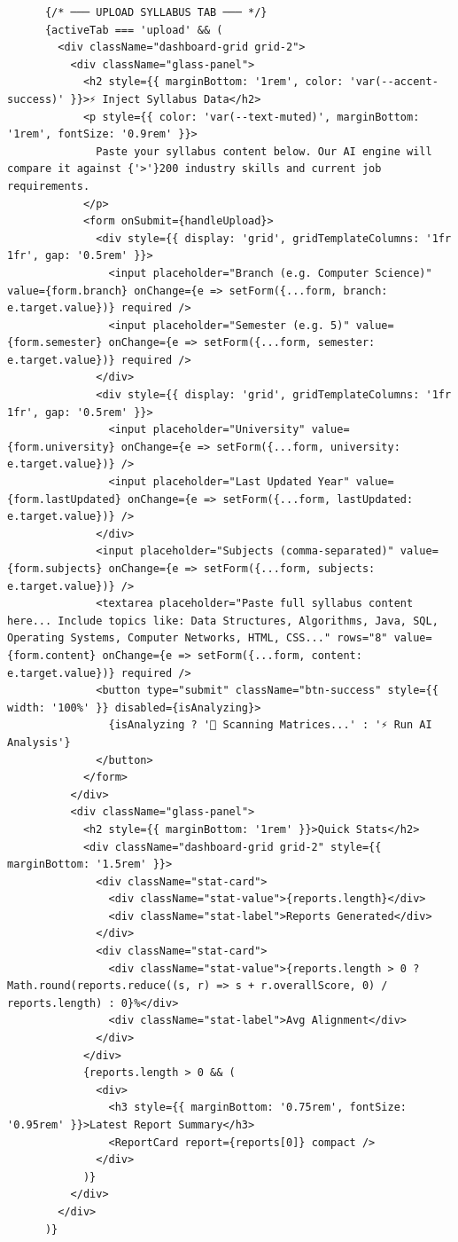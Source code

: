 \documentclass[12pt,a4paper]{report}
\begin{document}
\begin{verbatim}
      {/* ─── UPLOAD SYLLABUS TAB ─── */}
      {activeTab === 'upload' && (
        <div className="dashboard-grid grid-2">
          <div className="glass-panel">
            <h2 style={{ marginBottom: '1rem', color: 'var(--accent-success)' }}>⚡ Inject Syllabus Data</h2>
            <p style={{ color: 'var(--text-muted)', marginBottom: '1rem', fontSize: '0.9rem' }}>
              Paste your syllabus content below. Our AI engine will compare it against {'>'}200 industry skills and current job requirements.
            </p>
            <form onSubmit={handleUpload}>
              <div style={{ display: 'grid', gridTemplateColumns: '1fr 1fr', gap: '0.5rem' }}>
                <input placeholder="Branch (e.g. Computer Science)" value={form.branch} onChange={e => setForm({...form, branch: e.target.value})} required />
                <input placeholder="Semester (e.g. 5)" value={form.semester} onChange={e => setForm({...form, semester: e.target.value})} required />
              </div>
              <div style={{ display: 'grid', gridTemplateColumns: '1fr 1fr', gap: '0.5rem' }}>
                <input placeholder="University" value={form.university} onChange={e => setForm({...form, university: e.target.value})} />
                <input placeholder="Last Updated Year" value={form.lastUpdated} onChange={e => setForm({...form, lastUpdated: e.target.value})} />
              </div>
              <input placeholder="Subjects (comma-separated)" value={form.subjects} onChange={e => setForm({...form, subjects: e.target.value})} />
              <textarea placeholder="Paste full syllabus content here... Include topics like: Data Structures, Algorithms, Java, SQL, Operating Systems, Computer Networks, HTML, CSS..." rows="8" value={form.content} onChange={e => setForm({...form, content: e.target.value})} required />
              <button type="submit" className="btn-success" style={{ width: '100%' }} disabled={isAnalyzing}>
                {isAnalyzing ? '🔮 Scanning Matrices...' : '⚡ Run AI Analysis'}
              </button>
            </form>
          </div>
          <div className="glass-panel">
            <h2 style={{ marginBottom: '1rem' }}>Quick Stats</h2>
            <div className="dashboard-grid grid-2" style={{ marginBottom: '1.5rem' }}>
              <div className="stat-card">
                <div className="stat-value">{reports.length}</div>
                <div className="stat-label">Reports Generated</div>
              </div>
              <div className="stat-card">
                <div className="stat-value">{reports.length > 0 ? Math.round(reports.reduce((s, r) => s + r.overallScore, 0) / reports.length) : 0}%</div>
                <div className="stat-label">Avg Alignment</div>
              </div>
            </div>
            {reports.length > 0 && (
              <div>
                <h3 style={{ marginBottom: '0.75rem', fontSize: '0.95rem' }}>Latest Report Summary</h3>
                <ReportCard report={reports[0]} compact />
              </div>
            )}
          </div>
        </div>
      )}


\end{verbatim}
\end{document}
